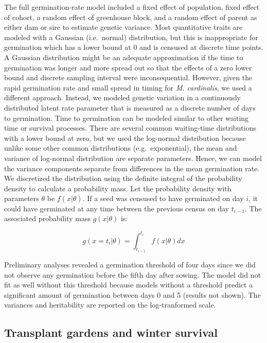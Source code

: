 \documentclass[
  12pt,
]{article}
\begin{document}
The full germination-rate model included a fixed effect of population, fixed effect of cohort, a random effect of greenhouse block, and a random effect of parent as either dam or sire to estimate genetic variance. Most quantitative traits are modeled with a Gaussian (i.e.~normal) distribution, but this is inappropriate for germination which has a lower bound at 0 and is censused at discrete time points. A Gaussian distribution might be an adequate approximation if the time to germination was longer and more spread out so that the effects of a zero lower bound and discrete sampling interval were inconsequential. However, given the rapid germination rate and small spread in timing for \emph{M. cardinalis}, we used a different approach. Instead, we modeled genetic variation in a continuously distributed latent rate parameter that is measured as a discrete number of days to germination. Time to germination can be modeled similar to other waiting time or survival processes. There are several common waiting-time distributions with a lower bound at zero, but we used the log-normal distribution because unlike some other common distributions (e.g.~exponential), the mean and variance of log-normal distribution are separate parameters. Hence, we can model the variance components separate from differences in the mean germination rate. We discretized the distribution using the definite integral of the probability density to calculate a probability mass. Let the probability density with parameters \(\theta\) be \(f(x|\theta)\). If a seed was censused to have germinated on day \(i\), it could have germinated at any time between the previous census on day \(t_{i-1}\). The associated probability mass \(g(x|\theta)\) is:

\[g(x=t_i|\theta) = \int_{t_{i-1}}^{t_i} f(x|\theta) dx\]

Preliminary analyses revealed a germination threshold of four days since we did not observe any germination before the fifth day after sowing. The model did not fit as well without this threshold because models without a threshold predict a significant amount of germination between days 0 and 5 (results not shown). The variances and heritability are reported on the log-tranformed scale.

\hypertarget{transplant-gardens-and-winter-survival}{%
\subsection{Transplant gardens and winter survival}\label{transplant-gardens-and-winter-survival}}
\end{document}
